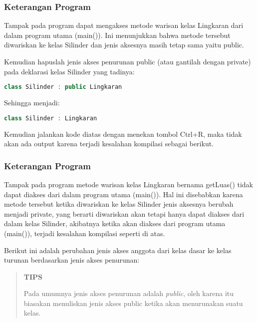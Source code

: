 \subsubsection*{Keterangan Program}

Tampak pada program dapat mengakses metode warisan kelas Lingkaran dari
dalam program utama (main()). Ini menunjukkan bahwa metode tersebut
diwariskan ke kelas Silinder dan jenis aksesnya masih tetap sama yaitu
public.

Kemudian hapuslah jenis akses penurunan public (atau gantilah dengan
private) pada deklarasi kelas Silinder yang tadinya:

\begin{lstlisting}[language=c++, numbers=none]
class Silinder : public Lingkaran
\end{lstlisting}

Sehingga menjadi:

\begin{lstlisting}[language=c++, numbers=none]
class Silinder : Lingkaran
\end{lstlisting}

Kemudian jalankan kode diatas dengan menekan tombol Ctrl+R, maka tidak
akan ada output karena terjadi kesalahan kompilasi sebagai berikut.

\begin{figure}[htbp]
\centering
{}

\end{figure}

\subsubsection*{Keterangan Program}

Tampak pada program metode warisan kelas Lingkaran bernama getLuas()
tidak dapat diakses dari dalam program utama (main()). Hal ini
disebabkan karena metode tersebut ketika diwariskan ke kelas Silinder
jenis aksesnya berubah menjadi private, yang berarti diwariskan akan
tetapi hanya dapat diakses dari dalam kelas Silinder, akibatnya ketika
akan diakses dari program utama (main()), terjadi kesalahan kompilasi
seperti di atas.

Berikut ini adalah perubahan jenis akses anggota dari kelas dasar ke
kelas turunan berdasarkan jenis akses penurunan:

\begin{quotation}
{\LARGE {}} 	\textbf{TIPS} 
	
	Pada
	umumnya jenis akses penurunan adalah \emph{public}, oleh karena itu
	biasakan menuliskan jenis akses public ketika akan menurunakan suatu
	kelas.
\end{quotation}
 

